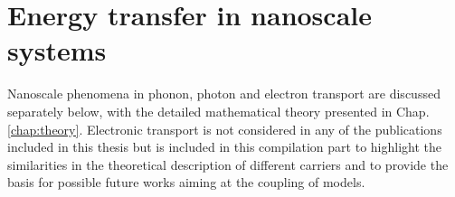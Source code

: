 \section{Energy transfer in nanoscale systems}
Nanoscale phenomena in phonon, photon and electron transport are discussed separately below, with the detailed mathematical theory presented in Chap. \ref{chap:theory}. Electronic transport is not considered in any of the publications included in this thesis but is included in this compilation part to highlight the similarities in the theoretical description of different carriers and to provide the basis for possible future works aiming at the coupling of models. %



